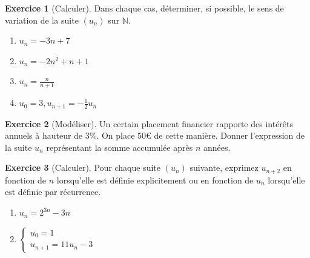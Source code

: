\documentclass{exam}
\theoremstyle{definition}
\newtheorem{exercice}{Exercice}
\begin{document}
\begin{exercice}[Calculer]
    Dans chaque cas, déterminer, si possible, le sens de variation de la suite $(u_n)$ sur $\mathbb{N}$.

    \begin{enumerate}
        \item $u_n = -3n + 7$
        \item $u_n = -2n^2 + n + 1$
        \item $u_n = \frac{n}{n+1}$
        \item $u_0 = 3, u_{n+1} = -\frac{1}{2}u_n$
    \end{enumerate}
\end{exercice}

\begin{center}
\end{center}

\begin{exercice}[Modéliser]
    Un certain placement financier rapporte des intérêts annuels à hauteur de $3\%$. On place 50€ de cette manière. Donner l'expression de la suite $u_n$ représentant la somme accumulée après $n$ années.

    \begin{center}
    \end{center}
\end{exercice}

\begin{exercice}[Calculer]
    Pour chaque suite $(u_n)$ suivante, exprimez $u_{n+2}$ en fonction de $n$ lorsqu'elle est définie explicitement ou en fonction de $u_n$ lorsqu'elle est définie par récurrence.
    \begin{enumerate}
        \item $u_n = 2^{3n} - 3n$
        \item $\begin{cases} u_0 = 1\\ u_{n+1} = 11 u_n - 3\end{cases}$
    \end{enumerate}
    \begin{center}
    \end{center}
\end{exercice}
\end{document}
